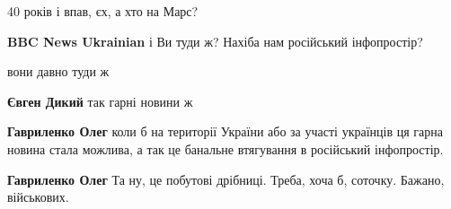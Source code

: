 \begin{itemize}
40 років і впав, єх, а хто на Марс?

 
\textbf{BBC News Ukrainian} і Ви туди ж? Нахіба нам російський інфопростір?

\begin{itemize}
 
вони давно туди ж

 
\textbf{Євген Дикий} так гарні новини ж

\begin{itemize}
 
\textbf{Гавриленко Олег} коли б на території України або за участі українців ця гарна новина стала можлива, а так це банальне втягування в російський інфопростір.

 
\textbf{Гавриленко Олег} Та ну, це побутові дрібниці. Треба, хоча б, соточку. Бажано, військових.
\end{itemize}

 

\end{itemize}
\end{itemize}
